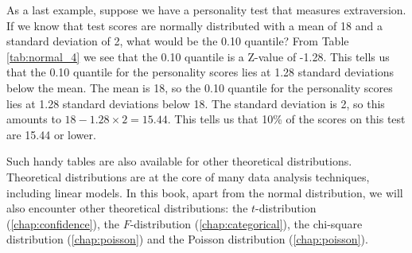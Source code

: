 \documentclass[]{book}\usepackage[]{graphicx}\usepackage[]{color}
\begin{document}
As a last example, suppose we have a personality test that measures extraversion. If we know that test scores are normally distributed with a mean of 18 and a standard deviation of 2, what would be the 0.10 quantile? From Table \ref{tab:normal_4} we see that the 0.10 quantile is a Z-value of -1.28. This tells us that the 0.10 quantile for the personality scores lies at 1.28 standard deviations below the mean. The mean is 18, so the 0.10 quantile for the personality scores lies at 1.28 standard deviations below 18. The standard deviation is 2, so this amounts to $18-1.28 \times 2= 15.44$. This tells us that 10\% of the scores on this test are 15.44 or lower.

Such handy tables are also available for other theoretical distributions. Theoretical distributions are at the core of many data analysis techniques, including linear models. In this book, apart from the normal distribution, we will also encounter other theoretical distributions: the $t$-distribution (\ref{chap:confidence}), the $F$-distribution (\ref{chap:categorical}), the chi-square distribution (\ref{chap:poisson}) and the Poisson distribution (\ref{chap:poisson}).
\end{document}
